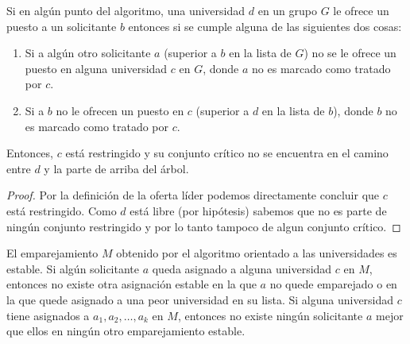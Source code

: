 \begin{lem}
Si en algún punto del algoritmo, una universidad $d$ en un grupo $G$ le ofrece un puesto a un solicitante $b$ entonces si se cumple alguna de las siguientes dos cosas:
\begin{enumerate}
\item Si a algún otro solicitante $a$ (superior a $b$ en la lista de $G$) no se le ofrece un puesto en alguna universidad $c$ en $G$, donde $a$ no es marcado como tratado por $c$.
\item Si a $b$ no le ofrecen un puesto en $c$ (superior a $d$ en la lista de $b$), donde $b$ no es marcado como tratado por $c$.
\end{enumerate}
Entonces, $c$ está restringido y su conjunto crítico no se encuentra en el camino entre $d$ y la parte de arriba del árbol.
\end{lem}
\begin{proof}
Por la definición de la oferta líder podemos directamente concluir que $c$ está restringido. Como $d$ está libre (por hipótesis) sabemos que no es parte de ningún conjunto restringido y por lo tanto tampoco de algun conjunto crítico.
\end{proof}
\begin{teo}
El emparejamiento $M$ obtenido por el algoritmo orientado a las universidades es estable. Si algún solicitante $a$ queda asignado a alguna universidad $c$ en $M$, entonces no existe otra asignación estable en la que $a$ no quede emparejado o en la que quede asignado a una peor universidad en su lista. Si alguna universidad $c$ tiene asignados a $a_1,a_2,\dots,a_k$ en $M$, entonces no existe ningún solicitante $a$ mejor  que ellos en ningún otro emparejamiento estable.
\end{teo}
